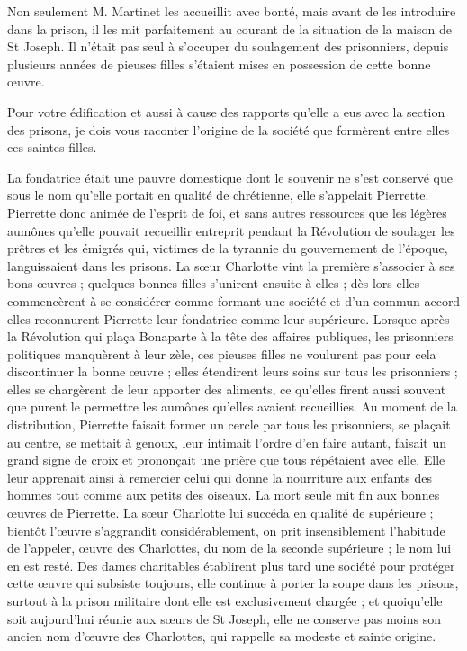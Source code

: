 Non seulement M. Martinet les accueillit avec bonté, mais avant de les introduire dans la prison, il les mit parfaitement au courant de la situation de la maison de St Joseph. Il n'était pas seul à s'occuper du soulagement des prisonniers, depuis plusieurs années de pieuses filles s'étaient mises en possession de cette bonne œuvre.

Pour votre édification et aussi à cause des rapports qu'elle a eus avec la section des prisons, je dois vous raconter l'origine de la société que formèrent entre elles ces saintes filles.

La fondatrice était une pauvre domestique dont le souvenir ne s'est conservé que sous le nom qu'elle portait en qualité de chrétienne, elle s'appelait Pierrette. Pierrette donc animée de l'esprit de foi, et sans autres ressources que les légères aumônes qu'elle pouvait recueillir entreprit pendant la Révolution
de soulager les prêtres et les émigrés qui, victimes de la tyrannie du gouvernement de l'époque, languissaient dans les prisons. La sœur Charlotte vint la première s'associer à ses bons œuvres ; quelques bonnes filles s'unirent ensuite à elles ; dès lors elles commencèrent à se considérer comme formant une société et d'un commun accord elles reconnurent Pierrette leur fondatrice comme leur supérieure. Lorsque après la Révolution qui plaça Bonaparte à la tête des affaires publiques, les prisonniers politiques manquèrent à leur zèle, ces pieuses filles ne voulurent pas pour cela discontinuer la bonne œuvre ; elles étendirent leurs soins sur tous les prisonniers ; elles se chargèrent de leur apporter des aliments, ce qu'elles firent aussi souvent que purent le permettre les aumônes qu'elles avaient recueillies. Au moment de la distribution, Pierrette faisait former un cercle par tous les prisonniers, se plaçait au centre, se mettait à genoux, leur intimait l'ordre d'en faire autant, faisait un grand signe de croix et prononçait une prière que tous répétaient avec elle. Elle leur apprenait ainsi à remercier celui qui donne la nourriture aux enfants des hommes tout comme aux petits des oiseaux. La mort seule mit fin aux bonnes œuvres de Pierrette. La sœur Charlotte lui succéda en qualité de supérieure ; bientôt l'œuvre s'aggrandit considérablement, on prit insensiblement l'habitude de l'appeler, œuvre des Charlottes, du nom de la seconde supérieure ; le nom lui en est resté. Des dames charitables établirent plus tard une société pour protéger cette œuvre qui subsiste toujours, elle continue à porter la soupe dans les prisons, surtout à la prison militaire dont elle est exclusivement chargée ;
et quoiqu'elle soit aujourd'hui réunie aux sœurs de St Joseph, elle ne conserve pas moins son ancien nom d'œuvre des Charlottes, qui rappelle sa modeste et sainte origine.

